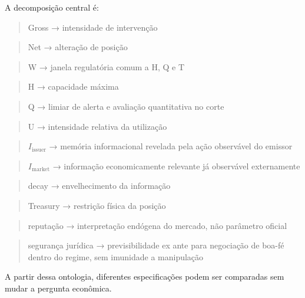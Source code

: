 \documentclass[
  a4paper,
]{article}
\begin{document}
A decomposição central é:

\begin{quote}
Gross → intensidade de intervenção
\end{quote}

\begin{quote}
Net → alteração de posição
\end{quote}

\begin{quote}
W → janela regulatória comum a H, Q e T
\end{quote}

\begin{quote}
H → capacidade máxima
\end{quote}

\begin{quote}
Q → limiar de alerta e avaliação quantitativa no corte
\end{quote}

\begin{quote}
U → intensidade relativa da utilização
\end{quote}

\begin{quote}
\(I_{\mathrm{issuer}}\) → memória informacional revelada pela ação
observável do emissor
\end{quote}

\begin{quote}
\(I_{\mathrm{market}}\) → informação economicamente relevante já
observável externamente
\end{quote}

\begin{quote}
decay → envelhecimento da informação
\end{quote}

\begin{quote}
Treasury → restrição física da posição
\end{quote}

\begin{quote}
reputação → interpretação endógena do mercado, não parâmetro oficial
\end{quote}

\begin{quote}
segurança jurídica → previsibilidade ex ante para negociação de boa-fé
dentro do regime, sem imunidade a manipulação
\end{quote}

A partir dessa ontologia, diferentes especificações podem ser comparadas
sem mudar a pergunta econômica.
\end{document}
